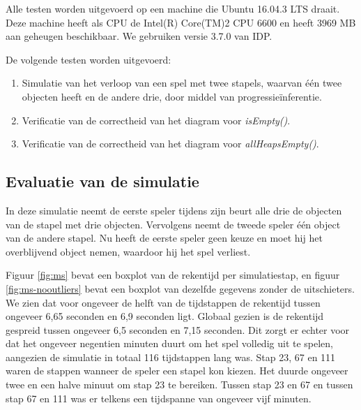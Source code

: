 Alle testen worden uitgevoerd op een machine die Ubuntu 16.04.3 LTS draait. Deze machine heeft als CPU de Intel(R) Core(TM)2 CPU 6600 en heeft 3969 MB aan geheugen beschikbaar. We gebruiken versie 3.7.0 van IDP.

De volgende testen worden uitgevoerd:

\begin{enumerate}
	\item Simulatie van het verloop van een spel met twee stapels, waarvan \'e\'en twee objecten heeft en de andere drie, door middel van progressie\"inferentie.
	\item Verificatie van de correctheid van het diagram voor \textit{isEmpty()}.
	\item Verificatie van de correctheid van het diagram voor \textit{allHeapsEmpty()}. 
\end{enumerate}

\subsection{Evaluatie van de simulatie}

In deze simulatie neemt de eerste speler tijdens zijn beurt alle drie de objecten van de stapel met drie objecten. Vervolgens neemt de tweede speler \'e\'en object van de andere stapel. Nu heeft de eerste speler geen keuze en moet hij het overblijvend object nemen, waardoor hij het spel verliest.

Figuur \ref{fig:ms} bevat een boxplot van de rekentijd per simulatiestap, en figuur \ref{fig:ms-nooutliers} bevat een boxplot van dezelfde gegevens zonder de uitschieters. We zien dat voor ongeveer de helft van de tijdstappen de rekentijd tussen ongeveer 6,65 seconden en 6,9 seconden ligt. Globaal gezien is de rekentijd gespreid tussen ongeveer 6,5 seconden en 7,15 seconden. Dit zorgt er echter voor dat het ongeveer negentien minuten duurt om het spel volledig uit te spelen, aangezien de simulatie in totaal 116 tijdstappen lang was. Stap 23, 67 en 111 waren de stappen wanneer de speler een stapel kon kiezen. Het duurde ongeveer twee en een halve minuut om stap 23 te bereiken. Tussen stap 23 en 67 en tussen stap 67 en 111 was er telkens een tijdspanne van ongeveer vijf minuten.

